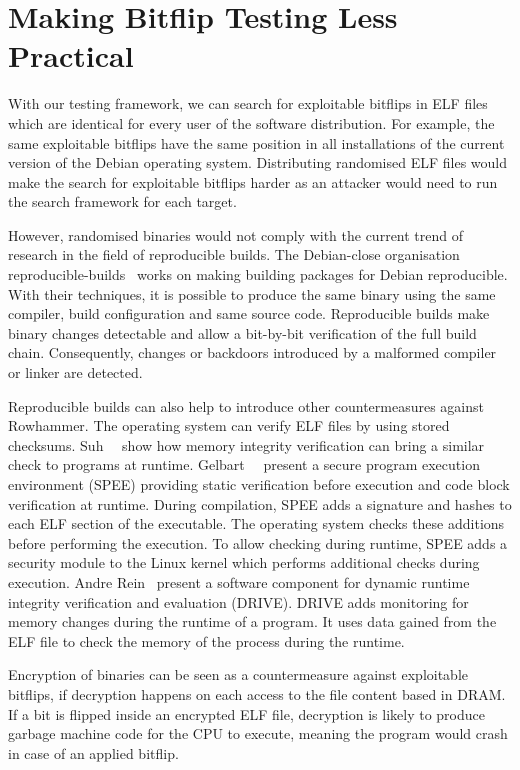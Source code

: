 \section{Making Bitflip Testing Less Practical}

With our testing framework, we can search for exploitable bitflips in ELF files
which are identical for every user of the software distribution. For example,
the same exploitable bitflips have the same position in all installations of the
current version of the Debian operating system. Distributing randomised ELF
files would make the search for exploitable bitflips harder as an attacker would
need to run the search framework for each target.

However, randomised binaries would not comply with the current trend of research
in the field of reproducible builds. The Debian-close organisation
reproducible-builds~\cite{reprobuilds} works on making building packages for
Debian reproducible. With their techniques, it is possible to produce the same
binary using the same compiler, build configuration and same source code.
Reproducible builds make binary changes detectable and allow a bit-by-bit
verification of the full build chain. Consequently, changes or backdoors
introduced by a malformed compiler or linker are detected.

Reproducible builds can also help to introduce other countermeasures against
Rowhammer. The operating system can verify ELF files by using stored checksums.
Suh~\etal~\cite{memintegrity} show how memory integrity verification can bring a
similar check to programs at runtime. Gelbart~\etal~\cite{spee} present a secure
program execution environment (SPEE) providing static verification before
execution and code block verification at runtime. During compilation, SPEE adds
a signature and hashes to each ELF section of the executable. The operating
system checks these additions before performing the execution. To allow checking
during runtime, SPEE adds a security module to the Linux kernel which performs
additional checks during execution. Andre Rein~\cite{drive} present a software
component for dynamic runtime integrity verification and evaluation (DRIVE).
DRIVE adds monitoring for memory changes during the runtime of a program. It
uses data gained from the ELF file to check the memory of the process during the
runtime.

Encryption of binaries can be seen as a countermeasure against exploitable
bitflips, if decryption happens on each access to the file content based in
DRAM. If a bit is flipped inside an encrypted ELF file, decryption is
likely to produce garbage machine code for the CPU to execute, meaning the
program would crash in case of an applied bitflip.

